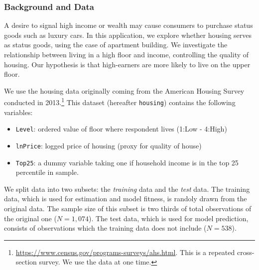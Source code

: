 \documentclass[
  12pt,
]{article}
\providecommand{\tightlist}{%
  \setlength{\itemsep}{0pt}\setlength{\parskip}{0pt}}
\begin{document}
\hypertarget{background-and-data-1}{%
\subsubsection{Background and Data}\label{background-and-data-1}}

A desire to signal high income or wealth may cause consumers to purchase status goods such as luxury cars.
In this application, we explore whether housing serves as status goods, using the case of apartment building.
We investigate the relationship between living in a high floor and income, controlling the quality of housing.
Our hypothesis is that high-earners are more likely to live on the upper floor.

We use the housing data originally coming from the American Housing Survey conducted in 2013.\footnote{\url{https://www.census.gov/programs-surveys/ahs.html}. This is a repeated cross-section survey. We use the data at one time.}
This dataset (hereafter \texttt{housing}) contains the following variables:

\begin{itemize}
\tightlist
\item
  \texttt{Level}: ordered value of floor where respondent lives (1:Low - 4:High)
\item
  \texttt{lnPrice}: logged price of housing (proxy for quality of house)
\item
  \texttt{Top25}: a dummy variable taking one if household income is in the top 25 percentile in sample.
\end{itemize}

We split data into two subsets: the \emph{training} data and the \emph{test} data.
The training data, which is used for estimation and model fitness, is randoly drawn from the original data.
The sample size of this subset is two thirds of total observations of the original one (\(N = 1,074\)).
The test data, which is used for model prediction, consists of observations which the training data does not include (\(N = 538\)).
\end{document}
